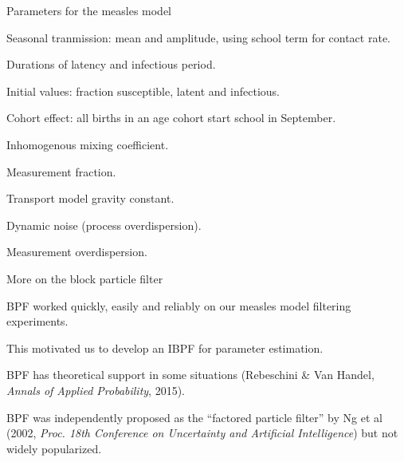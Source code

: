 \documentclass{beamer}
\begin{document}
\begin{frame}{Parameters for the measles model}
  \bi
\item Seasonal tranmission: mean and amplitude, using school term for contact rate.
  \item Durations of latency and infectious period.
\item Initial values: fraction susceptible, latent and infectious.
\item Cohort effect: all births in an age cohort start school in September.
\item Inhomogenous mixing coefficient.
\item Measurement fraction.
\item Transport model gravity constant.
\item Dynamic noise (process overdispersion).
\item Measurement overdispersion.

\ei

  \end{frame}

\begin{frame}{More on the block particle filter}

\bi
\item BPF worked quickly, easily and reliably on our measles model filtering experiments.

\item This motivated us to develop an IBPF for parameter estimation.
   
\item BPF has theoretical support in some situations (Rebeschini \& Van Handel, {\it Annals of Applied Probability}, 2015).

\item BPF was independently proposed as the ``factored particle filter'' by Ng et al (2002, {\it Proc. 18th Conference on Uncertainty and Artificial Intelligence}) but not widely popularized.

\ei

\end{frame}
\end{document}
